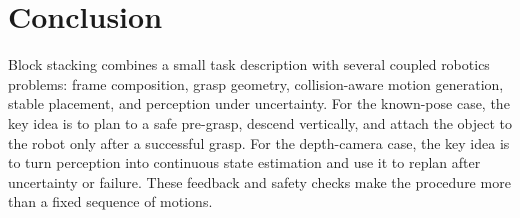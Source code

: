 \documentclass{article}
\begin{document}
\section{Conclusion}\label{sec:conclusion}

Block stacking combines a small task description with several coupled robotics
problems: frame composition, grasp geometry, collision-aware motion generation,
stable placement, and perception under uncertainty. For the known-pose case,
the key idea is to plan to a safe pre-grasp, descend vertically, and attach the
object to the robot only after a successful grasp. For the depth-camera case,
the key idea is to turn perception into continuous state estimation and use it
to replan after uncertainty or failure. These feedback and safety checks make
the procedure more than a fixed sequence of motions.

\begingroup
\small
\setlength{\bibsep}{2pt}


\endgroup
\end{document}

